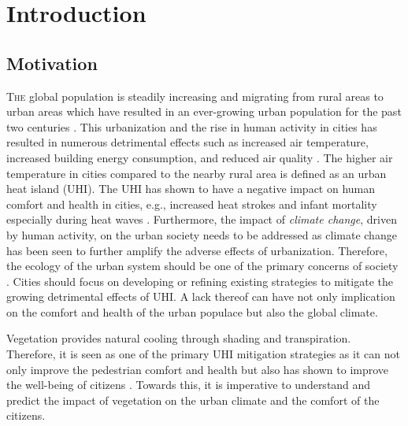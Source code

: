 \chapter{Introduction}
\label{ch:introduction}

\def\figdir{chapters/ch01_introduction/figures}


%		

\section{Motivation}

\lettrine[lines=3,nindent=0em,loversize=0.1]{T}{he} global population is steadily increasing and migrating from rural areas to urban areas which have resulted in an ever-growing urban population for the past two centuries \citep{Oke2017a}. This urbanization and the rise in human activity in cities has resulted in numerous detrimental effects such as increased air temperature, increased building energy consumption, and reduced air quality \citep{santamouris2001energy,Kovats2008,Salmond2016}. The higher air temperature in cities compared to the nearby rural area is defined as an urban heat island (UHI). The UHI has shown to have a negative impact on human comfort and health in cities, e.g., increased heat strokes and infant mortality especially during heat waves \citep{Fouillet2006}. Furthermore, the impact of \textit{climate change}, driven by human activity, on the urban society needs to be addressed as climate change has been seen to further amplify the adverse effects of urbanization. Therefore, the ecology of the urban system should be one of the primary concerns of society \citep{pachauri2014climate}. Cities should focus on developing or refining existing strategies to mitigate the growing detrimental effects of UHI. A lack thereof can have not only implication on the comfort and health of the urban populace but also the global climate. 

Vegetation provides natural cooling through shading and transpiration. Therefore, it is seen as one of the primary UHI mitigation strategies as it can not only improve the pedestrian comfort and health \citep{Gillner2015, Bowler2010, Loughner2012} but also has shown to improve the well-being of citizens \citep{Donovan2010,Kuo2001}. Towards this, it is imperative to understand and predict the impact of vegetation on the urban climate and the comfort of the citizens.

